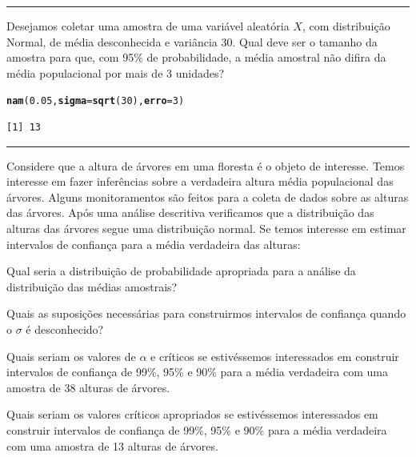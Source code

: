 \documentclass[a4paper,11pt,fleqn]{article}\usepackage[]{graphicx}\usepackage[]{color}
\makeatletter
\newcommand{\hlnum}[1]{\textcolor[rgb]{0,0,0}{#1}}%
\newcommand{\hlstd}[1]{\textcolor[rgb]{0,0,0}{#1}}%
\newcommand{\hlkwc}[1]{\textcolor[rgb]{0,0,0}{\textbf{#1}}}%
\newcommand{\hlkwd}[1]{\textcolor[rgb]{0,0,0}{\textbf{#1}}}%
\newenvironment{kframe}{%
 \def\at@end@of@kframe{}%
 \ifinner\ifhmode%
  \def\at@end@of@kframe{\end{minipage}}%
  \begin{minipage}{\columnwidth}%
 \fi\fi%
 \def\FrameCommand##1{\hskip\@totalleftmargin \hskip-\fboxsep
 \colorbox{shadecolor}{##1}\hskip-\fboxsep
     \hskip-\linewidth \hskip-\@totalleftmargin \hskip\columnwidth}%
 \MakeFramed {\advance\hsize-\width
   \@totalleftmargin\z@ \linewidth\hsize
   \@setminipage}}%
 {\par\unskip\endMakeFramed%
 \at@end@of@kframe}
\newenvironment{knitrout}{}{} %
\theoremstyle{definition}
\makeatother
\begin{document}
\vspace{0.3cm}
\hrule
\vspace{0.3cm}

\begin{compactenum}[7.] %
\item Desejamos coletar uma amostra de uma variável aleatória $X$, com
  distribuição Normal, de média desconhecida e variância 30. Qual deve
  ser o tamanho da amostra para que, com 95\% de probabilidade, a média
  amostral não difira da média populacional por mais de 3 unidades?
\begin{knitrout}\small
{}\color{fgcolor}\begin{kframe}
\begin{alltt}
\hlkwd{nam}\hlstd{(}\hlnum{0.05}\hlstd{,} \hlkwc{sigma} \hlstd{=} \hlkwd{sqrt}\hlstd{(}\hlnum{30}\hlstd{),} \hlkwc{erro} \hlstd{=} \hlnum{3}\hlstd{)}
\end{alltt}
\begin{verbatim}
[1] 13
\end{verbatim}
\end{kframe}
\end{knitrout}
\end{compactenum}

\vspace{0.3cm}
\hrule
\vspace{0.3cm}

\begin{compactenum}[8.]
\item Considere que a altura de árvores em uma floresta é o
  objeto de interesse. Temos interesse em fazer inferências sobre a
  verdadeira altura média populacional das árvores. Alguns monitoramentos
  são feitos para a coleta de dados sobre as alturas das árvores. Após uma
  análise descritiva verificamos que a distribuição das alturas das
  árvores segue uma distribuição normal. Se temos interesse em estimar
  intervalos de confiança para a média verdadeira das alturas:
  \begin{compactenum}
  \item Qual seria a distribuição de probabilidade apropriada para a
    análise da distribuição das médias amostrais?
  \item Quais as suposições necessárias para construirmos intervalos de
    confiança quando o $\sigma$ é desconhecido?
  \item Quais seriam os valores de $\alpha$ e críticos se estivéssemos
    interessados em construir intervalos de confiança de 99\%, 95\% e 90\%
    para a média verdadeira com uma amostra de 38 alturas de árvores.
  \item Quais seriam os valores críticos apropriados se estivéssemos
    interessados em construir intervalos de confiança de 99\%, 95\% e 90\%
    para a média verdadeira com uma amostra de 13 alturas de árvores.
  \end{compactenum}
\end{compactenum}
\end{document}
